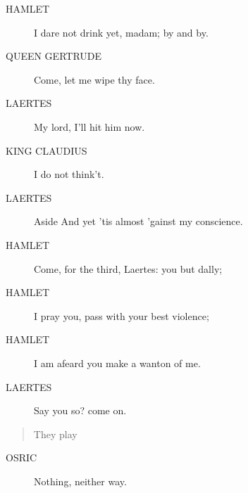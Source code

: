 \documentclass{article}
\begin{document}
\begin{description}
            
\item[HAMLET] I dare not drink yet, madam; by and by.
\end{description}
          
\begin{description}
            
\item[QUEEN GERTRUDE] Come, let me wipe thy face.
\end{description}
          
\begin{description}
            
\item[LAERTES] My lord, I'll hit him now.
\end{description}
          
\begin{description}
            
\item[KING CLAUDIUS] I do not think't.
\end{description}
          
\begin{description}
            
\item[LAERTES] 
               Aside  And yet 'tis almost 'gainst my conscience.
\end{description}
          
\begin{description}
            
\item[HAMLET] Come, for the third, Laertes: you but dally;
\item[HAMLET] I pray you, pass with your best violence;
\item[HAMLET] I am afeard you make a wanton of me.
\end{description}
          
\begin{description}
            
\item[LAERTES] Say you so? come on.
\end{description}
          
\begin{quote}
They play
\end{quote}
          
\begin{description}
            
\item[OSRIC] Nothing, neither way.
\end{description}
          
\end{document}
